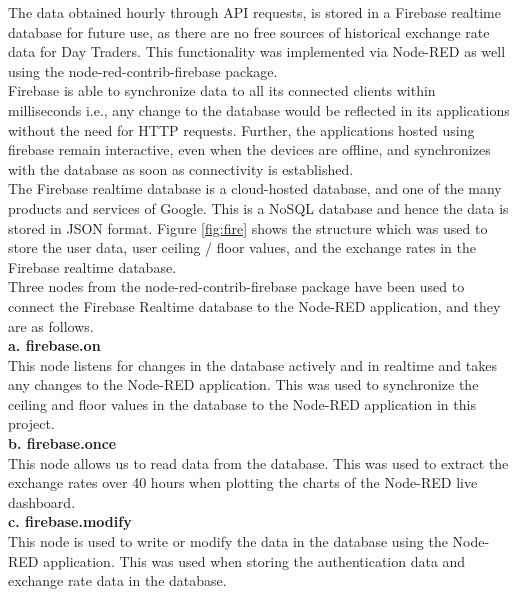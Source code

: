 The data obtained hourly through API requests, is stored in a Firebase realtime database \cite{firebase} for future use, as there are no free sources of historical exchange rate data for Day Traders. This functionality was implemented via Node-RED as well using the node-red-contrib-firebase \cite{noderedfire} package.\\

Firebase is able to synchronize data to all its connected clients within milliseconds i.e., any change to the database would be reflected in its applications without the need for HTTP requests. Further, the applications hosted using firebase remain interactive, even when the devices are offline, and synchronizes with the database as soon as connectivity is established.\\

The Firebase realtime database is a cloud-hosted database, and one of the many products and services of Google. This is a NoSQL database and hence the data is stored in JSON format. Figure \ref{fig:fire} shows the structure which was used to store the user data, user ceiling / floor values, and the exchange rates in the Firebase realtime database.\\

Three nodes from the node-red-contrib-firebase package have been used to connect the Firebase Realtime database to the Node-RED application, and they are as follows.\\

\textbf{a. firebase.on}\\

This node listens for changes in the database actively and in realtime and takes any changes to the Node-RED application. This was used to synchronize the ceiling and floor values in the database to the Node-RED application in this project.\\

\textbf{b. firebase.once} \\

This node allows us to read data from the database. This was used to extract the exchange rates over 40 hours when plotting the charts of the Node-RED live dashboard.\\

\textbf{c. firebase.modify}\\

This node is used to write or modify the data in the database using the Node-RED application. This was used when storing the authentication data and exchange rate data in the database.\\

